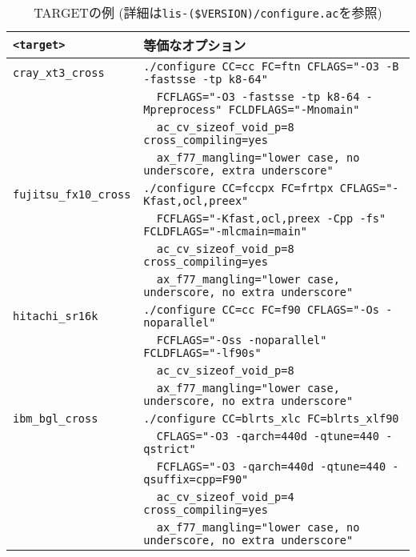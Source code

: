 \documentclass[a4paper]{jarticle}
\begin{document}
\begin{table}[htbp]
\caption{TARGETの例 (詳細は{\tt lis-(\$VERSION)/configure.ac}を参照) }
\label{targetoption}
\begin{center}
\begin{tabular}{|l|l|}
\hline
\verb+<target>+           & 等価なオプション \\ \hline
\verb+cray_xt3_cross+     & \verb+./configure CC=cc FC=ftn CFLAGS="-O3 -B -fastsse -tp k8-64"+ \\
                          & \verb+  FCFLAGS="-O3 -fastsse -tp k8-64 -Mpreprocess" FCLDFLAGS="-Mnomain"+\\
                          & \verb+  ac_cv_sizeof_void_p=8 cross_compiling=yes+\\
                          & \verb+  ax_f77_mangling="lower case, no underscore, extra underscore"+ \\ \hline
\verb+fujitsu_fx10_cross+ & \verb|./configure CC=fccpx FC=frtpx CFLAGS="-Kfast,ocl,preex"| \\
                          & \verb+  FCFLAGS="-Kfast,ocl,preex -Cpp -fs" FCLDFLAGS="-mlcmain=main"+\\
                          & \verb+  ac_cv_sizeof_void_p=8 cross_compiling=yes+\\
                          & \verb+  ax_f77_mangling="lower case, underscore, no extra underscore"+ \\ \hline
\verb+hitachi_sr16k+      & \verb|./configure CC=cc FC=f90 CFLAGS="-Os -noparallel"| \\
                          & \verb+  FCFLAGS="-Oss -noparallel" FCLDFLAGS="-lf90s"+ \\
                          & \verb+  ac_cv_sizeof_void_p=8+ \\
                          & \verb+  ax_f77_mangling="lower case, underscore, no extra underscore" + \\ \hline
\verb+ibm_bgl_cross+      & \verb+./configure CC=blrts_xlc FC=blrts_xlf90+ \\
                          & \verb+  CFLAGS="-O3 -qarch=440d -qtune=440 -qstrict"+ \\
                          & \verb+  FCFLAGS="-O3 -qarch=440d -qtune=440 -qsuffix=cpp=F90"+ \\
                          & \verb+  ac_cv_sizeof_void_p=4 cross_compiling=yes+\\
                          & \verb+  ax_f77_mangling="lower case, no underscore, no extra underscore"+ \\ \hline

\end{tabular}
\end{center}
\end{table}
\end{document}
